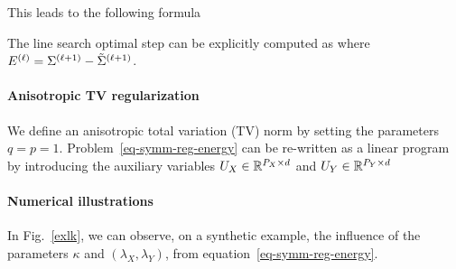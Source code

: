 This leads to the following formula

The line search optimal step can be explicitly computed as
where $E^{(\ell)} = \Sigma^{(\ell+1)} - \tilde{\Sigma}^{(\ell+1)}$.

\paragraph{Anisotropic TV regularization}

We define an anisotropic total variation (TV) norm by setting the parameters $q=p=1$.
Problem~\eqref{eq-symm-reg-energy} can be re-written as a linear program by introducing the auxiliary variables $U_X \in \mathbb{R}^{P_X \times d}$ and $U_Y \in \mathbb{R}^{P_Y \times d}$

\paragraph{Numerical illustrations}

In Fig.~\ref{exlk}, we can observe, on a synthetic example, the influence of the parameters $\kappa$ and $(\lambda_X, \lambda_Y)$, from equation~\eqref{eq-symm-reg-energy}. 

